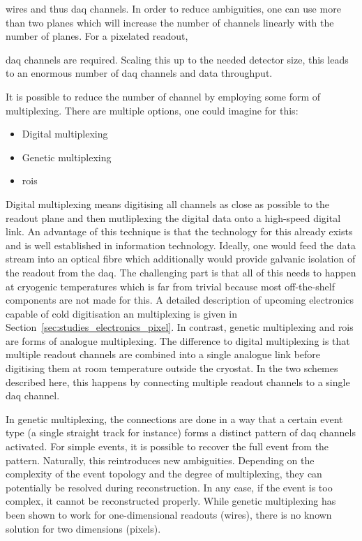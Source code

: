 wires and thus \gls{daq} channels.
In order to reduce ambiguities, one can use more than two planes which will increase the number of channels linearly with the number of planes.
For a pixelated readout,


\gls{daq} channels are required.
Scaling this up to the needed detector size, this leads to an enormous number of \gls{daq} channels and data throughput.

It is possible to reduce the number of channel by employing some form of multiplexing.
There are multiple options, one could imagine for this:
\begin{itemize}
	\item Digital multiplexing
	\item Genetic multiplexing
	\item \glspl{roi}
\end{itemize}

Digital multiplexing means digitising all channels as close as possible to the readout plane and then mutliplexing the digital data onto a high-speed digital link.
An advantage of this technique is that the technology for this already exists and is well established in information technology.
Ideally, one would feed the data stream into an optical fibre which additionally would provide galvanic isolation of the readout from the \gls{daq}.
The challenging part is that all of this needs to happen at cryogenic temperatures which is far from trivial because most off-the-shelf components are not made for this.
A detailed description of upcoming electronics capable of cold digitisation an multiplexing is given in Section~\ref{sec:studies_electronics_pixel}.
In contrast, genetic multiplexing and \glspl{roi} are forms of analogue multiplexing.
The difference to digital multiplexing is that multiple readout channels are combined into a single analogue link before digitising them at room temperature outside the cryostat.
In the two schemes described here, this happens by connecting multiple readout channels to a single \gls{daq} channel.

In genetic multiplexing, the connections are done in a way that a certain event type (a single straight track for instance) forms a distinct pattern of \gls{daq} channels activated.
For simple events, it is possible to recover the full event from the pattern.
Naturally, this reintroduces new ambiguities.
Depending on the complexity of the event topology and the degree of multiplexing, they can potentially be resolved during reconstruction.
In any case, if the event is too complex, it cannot be reconstructed properly.
While genetic multiplexing has been shown to work for one-dimensional readouts (wires), there is no known solution for two dimensions (pixels).

